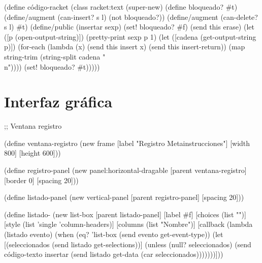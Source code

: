 \documentclass[letterpaper, twoside, openright, 11pt]{book}%
\begin{document}
{{{{{{{{{{(define código-racket%
  (class racket:text%
    (super-new)
    (define bloqueado? #t)
    (define/augment (can-insert? s l) (not bloqueado?))
    (define/augment (can-delete? s l) #t)
    (define/public (insertar sexp)
      (set! bloqueado? #f)
      (send this erase)
      (let ([p (open-output-string)])
        (pretty-print sexp p 1)
        (let ([cadena (get-output-string p)])
          (for-each (lambda (x)
                      (send this insert x)
                      (send this insert-return))
                    (map string-trim (string-split cadena "\\n"))))
      (set! bloqueado? #t)))))
\nwendcode{}\nwdocspar


\section{Interfaz gráfica}


\nwenddocs{}\endmoddef\nwstartdeflinemarkup{}\nwenddeflinemarkup
;; Ventana registro

(define ventana-registro
  (new frame%
       [label "Registro Metainstrucciones"]
       [width 800]
       [height 600]))

(define registro-panel
  (new panel:horizontal-dragable%
       [parent ventana-registro]
       [border 0]
       [spacing 20]))

(define listado-panel
  (new vertical-panel%
       [parent registro-panel]
       [spacing 20]))

(define listado-
  (new list-box%
       [parent listado-panel]
       [label #f]
       [choices (list "")]
       [style (list 'single
                    'column-headers)]
       [columns (list "Nombre")]
       [callback
        (lambda (listado evento)
          (when (eq? 'list-box (send evento get-event-type))
            (let [(seleccionados (send listado get-selections))]
              (unless (null? seleccionados)
                (send código-texto insertar
                      (send listado get-data (car seleccionados)))))))]))

}}}}}}}}}}
\end{document}
